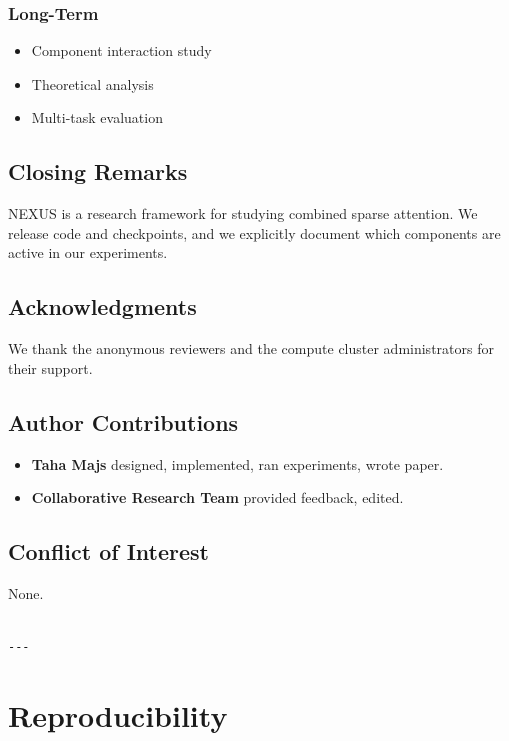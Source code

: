 \subsubsection{Long-Term}
\begin{itemize}
\item Component interaction study
\item Theoretical analysis
\item Multi-task evaluation

\end{itemize}
\subsection{Closing Remarks}

NEXUS is a research framework for studying combined sparse attention. We 
release code and checkpoints, and we explicitly document which components 
are active in our experiments.

\subsection{Acknowledgments}

We thank the anonymous reviewers and the compute cluster administrators for their support.

\subsection{Author Contributions}

\begin{itemize}
\item \textbf{Taha Majs} designed, implemented, ran experiments, wrote paper.
\item \textbf{Collaborative Research Team} provided feedback, edited.

\end{itemize}
\subsection{Conflict of Interest}

None.
\begin{lstlisting}

---
\end{lstlisting}

\section{Reproducibility}

